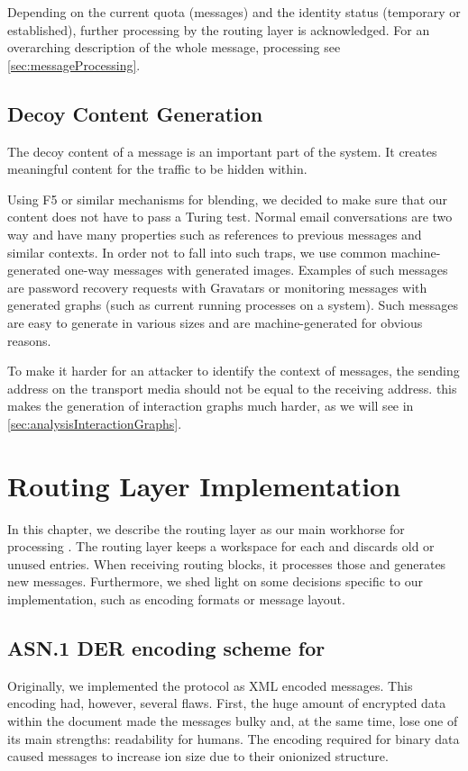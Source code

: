 Depending on the current quota (messages) and the identity status (temporary or established), further processing by the routing layer is acknowledged. For an overarching description of the whole message, processing see \cref{sec:messageProcessing}.


\section{Decoy Content Generation}
The decoy content of a message is an important part of the \MessageVortex{} system. It creates meaningful content for the traffic to be hidden within.

Using F5 or similar mechanisms for blending, we decided to make sure that our content does not have to pass a Turing test. Normal email conversations are two way and have many properties such as references to previous messages and similar contexts. In order not to fall into such traps, we use common machine-generated one-way messages with generated images. Examples of such messages are password recovery requests with Gravatars or monitoring messages with generated graphs (such as current running processes on a system). Such messages are easy to generate in various sizes and are machine-generated for obvious reasons.

To make it harder for an attacker to identify the context of messages, the sending address on the transport media should not be equal to the receiving address. this makes the generation of interaction graphs much harder, as we will see in \cref{sec:analysisInteractionGraphs}.

\chapter{Routing Layer Implementation}\label{sec:routingImplementation}
In this chapter, we describe the routing layer as our main workhorse for processing \VortexMessages. The routing layer keeps a workspace for each  and discards old or unused entries. When receiving routing blocks, it processes those and generates new messages. Furthermore, we shed light on some decisions specific to our implementation, such as encoding formats or message layout.

\section{ASN.1 DER encoding scheme for \VortexMessages}
Originally, we implemented the protocol as XML encoded messages. This encoding had, however, several flaws. First, the huge amount of encrypted data within the document made the messages bulky and, at the same time, lose one of its main strengths: readability for humans. The encoding required for binary data caused messages to increase ion size due to their onionized structure. 

